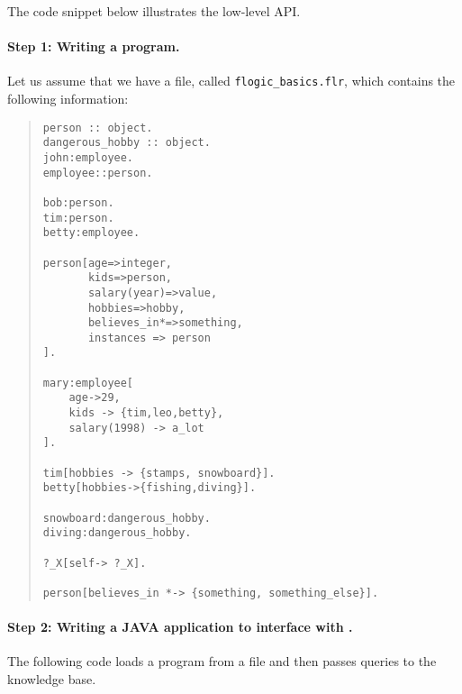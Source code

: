 The code snippet below illustrates the low-level API.

\paragraph{Step 1: Writing a \FLORA program.}
  Let us assume that we have a file, called  {\tt flogic\_basics.flr},
  which contains the following information:
\begin{quote}
\begin{verbatim}
person :: object.
dangerous_hobby :: object.
john:employee.
employee::person.

bob:person.
tim:person.
betty:employee.

person[age=>integer,
       kids=>person,
       salary(year)=>value,
       hobbies=>hobby,
       believes_in*=>something,
       instances => person
].

mary:employee[
    age->29,
    kids -> {tim,leo,betty},
    salary(1998) -> a_lot
].

tim[hobbies -> {stamps, snowboard}].
betty[hobbies->{fishing,diving}].

snowboard:dangerous_hobby.
diving:dangerous_hobby.

?_X[self-> ?_X].

person[believes_in *-> {something, something_else}].
\end{verbatim}
\end{quote}

\paragraph{Step 2:  Writing a JAVA application to interface with \FLORA.}
 The following code loads a \FLORA program from a file and then passes
 queries to the knowledge base.

